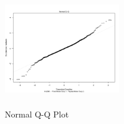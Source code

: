 





\begin{figure}[h!]
\includegraphics[height=2in, width=2in]{qqplot}
\caption{Normal Q-Q Plot}
\label{img:qqplot}
\end{figure}

